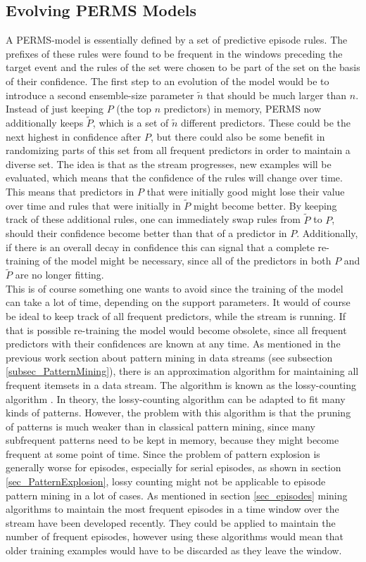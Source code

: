 \subsection{Evolving PERMS Models}
\label{subsec_evolvingPerms}
A PERMS-model is essentially defined by a set of predictive episode rules. The prefixes of these rules were found to be frequent in the windows preceding the target event and the rules of the set were chosen to be part of the set on the basis of their confidence. The first step to an evolution of the model would be to introduce a second ensemble-size parameter $\tilde{n}$ that should be much larger than $n$. Instead of just keeping $P$ (the top $n$ predictors) in memory, PERMS now additionally keeps $\tilde{P}$, which is a set of $\tilde{n}$ different predictors. These could be the next highest in confidence after $P$, but there could also be some benefit in randomizing parts of this set from all frequent predictors in order to maintain a diverse set. The idea is that as the stream progresses, new examples will be evaluated, which means that the confidence of the rules will change over time. This means that predictors in $P$ that were initially good might lose their value over time and rules that were initially in $\tilde{P}$ might become better. By keeping track of these additional rules, one can immediately swap rules from $\tilde{P}$ to $P$, should their confidence become better than that of a predictor in $P$. Additionally, if there is an overall decay in confidence this can signal that a complete re-training of the model might be necessary, since all of the predictors in both $P$ and $\tilde{P}$ are no longer fitting. \\
This is of course something one wants to avoid since the training of the model can take a lot of time, depending on the support parameters. It would of course be ideal to keep track of all frequent predictors, while the stream is running. If that is possible re-training the model would become obsolete, since all frequent predictors with their confidences are known at any time. As mentioned in the previous work section about pattern mining in data streams  (see subsection \ref{subsec_PatternMining}), there is an approximation algorithm for maintaining all frequent itemsets in a data stream. The algorithm is known as the lossy-counting algorithm \cite{manku2002approximate}. In theory, the lossy-counting algorithm can be adapted to fit many kinds of patterns.  However, the problem with this algorithm is that the pruning of patterns is much weaker than in classical pattern mining, since many subfrequent patterns need to be kept in memory, because they might become frequent at some point of time. Since the problem of pattern explosion is generally worse for episodes, especially for serial episodes, as shown in section \ref{sec_PatternExplosion}, lossy counting might not be applicable to episode pattern mining in a lot of cases. As mentioned in section \ref{sec_episodes} mining algorithms to maintain the most frequent episodes in a time window over the stream have been developed recently. They could be applied to maintain the number of frequent episodes, however using these algorithms would mean that older training examples would have to be discarded as they leave the window.

